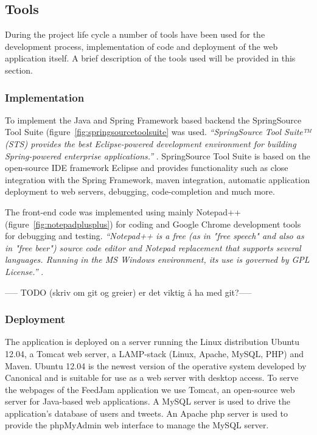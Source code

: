 \subsection{Tools}
During the project life cycle a number of tools have been used for the development process, implementation of code and deployment of the web application itself. A brief description of the tools used will be provided in this section.

\subsubsection{Implementation}
To implement the Java and Spring Framework based backend the SpringSource Tool Suite (figure~\ref{fig:springsourcetoolsuite} was used. \textit{``SpringSource Tool Suite™ (STS) provides the best Eclipse-powered development environment for building Spring-powered enterprise applications.''} \cite{SpringSource}. SpringSource Tool Suite is based on the open-source IDE framework Eclipse and provides functionality such as close integration with the Spring Framework, maven integration, automatic application deployment to web servers, debugging, code-completion and much more.

The front-end code was implemented using mainly Notepad++ (figure~\ref{fig:notepadplusplus}) for coding and Google Chrome development tools for debugging and testing. \textit{``Notepad++ is a free (as in "free speech" and also as in "free beer") source code editor and Notepad replacement that supports several languages. Running in the MS Windows environment, its use is governed by GPL License.''} \cite{Ho2012}.

----- TODO (skriv om git og greier) er det  viktig å ha med git?-----

\subsubsection{Deployment}

The application is deployed on a server running the Linux distribution Ubuntu 12.04, a Tomcat web server, a LAMP-stack (Linux, Apache, MySQL, PHP) and Maven. Ubuntu 12.04 is the newest version of the operative system developed by Canonical and is suitable for use as a web server with desktop access. To serve the webpages of the FeedJam application we use Tomcat, an open-source web server for Java-based web applications. A MySQL server is used to drive the application's database of users and tweets. An Apache php server is used to provide the phpMyAdmin web interface to manage the MySQL server.

